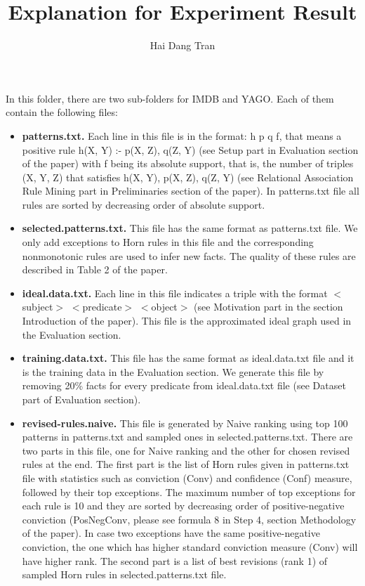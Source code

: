 \documentclass[12pt]{article}
\begin{document}
\title{Explanation for Experiment Result}
\author{Hai Dang Tran}
\maketitle

In this folder, there are two sub-folders for IMDB and YAGO. Each of them contain the following files:

\begin{itemize}

\item \textbf{patterns.txt.} Each line in this file is in the format: h p q f, that means a positive rule h(X, Y) :- p(X, Z), q(Z, Y) (see Setup part in Evaluation section of the paper) with f being its absolute support, that is, the number of triples (X, Y, Z) that satisfies h(X, Y), p(X, Z), q(Z, Y) (see Relational Association Rule Mining part in Preliminaries section of the paper). In patterns.txt file all rules are sorted by decreasing order of absolute support.

\item \textbf{selected.patterns.txt.} This file has the same format as patterns.txt file. We only add exceptions to Horn rules in this file and the corresponding nonmonotonic rules are used to infer new facts. The quality of these rules are described in Table 2 of the paper.

\item \textbf{ideal.data.txt.} Each line in this file indicates a triple with the format $<$subject$>$ $<$predicate$>$ $<$object$>$ (see Motivation part in the section Introduction of the paper). This file is the approximated ideal graph used in the Evaluation section.

\item \textbf{training.data.txt.} This file has the same format as ideal.data.txt file and it is the training data in the Evaluation section. We generate this file by removing 20\% facts for every predicate from ideal.data.txt file (see Dataset part of Evaluation section).

\item \textbf{revised-rules.naive.} This file is generated by Naive ranking using top 100 patterns in patterns.txt and sampled ones in selected.patterns.txt. There are two parts in this file, one for Naive ranking and the other for chosen revised rules at the end. The first part is the list of Horn rules given in patterns.txt file with statistics such as conviction (Conv) and confidence (Conf) measure, followed by their top exceptions. The maximum number of top exceptions for each rule is 10 and they are sorted by decreasing order of positive-negative conviction (PosNegConv, please see formula 8 in Step 4, section Methodology of the paper). In case two exceptions have the same positive-negative conviction, the one which has higher standard conviction measure (Conv) will have higher rank. The second part is a list of best revisions (rank 1) of sampled Horn rules in selected.patterns.txt file.


\end{itemize}
\end{document}
